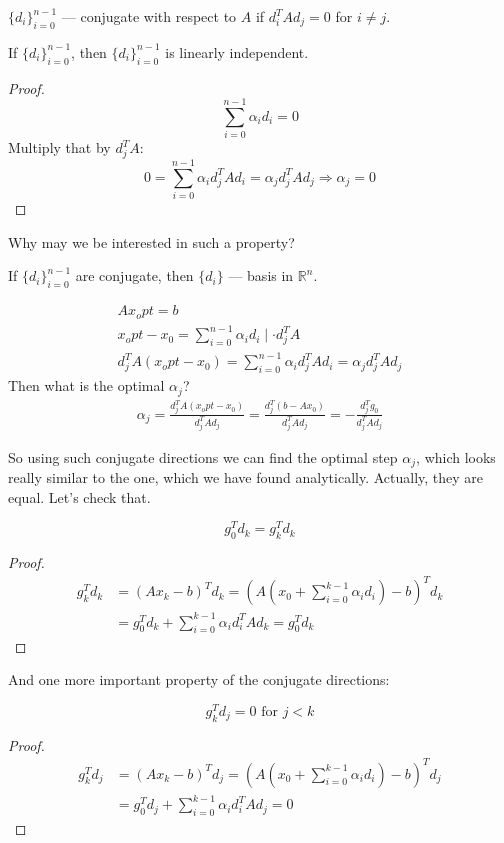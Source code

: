 \begin{conj}
    $\{d_i\}^{n-1}_{i=0}$ --- conjugate with respect  to $A$ if $d_i^T A d_j = 0$ for $i \neq j$.
\end{conj}

\begin{theorem}
    If $\{d_i\}^{n-1}_{i=0}$, then $\{d_i\}^{n-1}_{i=0}$ is linearly independent.
\end{theorem}
\begin{proof}
    \[
        \sum^{n-1}_{i=0} \alpha_i d_i = 0 
    \]
    Multiply that by $d_j^T A$:
    \[
        0 = \sum^{n-1}_{i=0} \alpha_i d_j^T A d_i = \alpha_j d_j^T A d_j \Longrightarrow \alpha_j = 0
    \]
\end{proof}

Why may we be interested in such a property?

If $\{d_i\}^{n-1}_{i=0}$ are conjugate, then $\{d_i\}$ --- basis in $\mathbb{R}^n$.

\begin{gather*}
    A x_opt = b \\ 
    x_opt - x_0 = \sum^{n-1}_{i=0} \alpha_i d_i \mid \cdot d_j^T A \\
    d_j^T A (x_opt - x_0) = \sum^{n-1}_{i=0} \alpha_i d_j^T A d_i = \alpha_j d_j^T A d_j
\end{gather*}
Then what is the optimal $\alpha_j$?
\begin{gather*}
    \alpha_j = \frac{d_j^T A (x_opt - x_0)}{d_j^T A d_j} = \frac{d_j^T (b - A x_0)}{d_j^T A d_j} = - \frac{d_j^T g_0}{d_j^T A d_j}
\end{gather*}

So using such conjugate directions we can find the optimal step $\alpha_j$, which looks really similar to the one, which we have found analytically. Actually, they are equal. Let's check that. 

\begin{theorem}
    \[
        g_0^T d_k = g_k^T d_k
    \]
\end{theorem}
\begin{proof}
    \begin{align*}
        g_k^T d_k &= (A x_k - b)^T d_k = (A (x_0 + \sum^{k-1}_{i=0} \alpha_i d_i) - b)^T d_k \\
        &= g_0^T d_k + \sum^{k-1}_{i=0} \alpha_i d_i^T A d_k = g_0^T d_k
    \end{align*}
\end{proof}

And one more important property of the conjugate directions:
\begin{theorem}
    \[
        g_k^T d_j = 0 \text{ for } j < k
    \]
\end{theorem}
\begin{proof}
    \begin{align*}
        g_k^T d_j &= (A x_k - b)^T d_j = (A (x_0 + \sum^{k-1}_{i=0} \alpha_i d_i) - b)^T d_j \\
        &= g_0^T d_j + \sum^{k-1}_{i=0} \alpha_i d_i^T A d_j = 0
    \end{align*}
\end{proof}


